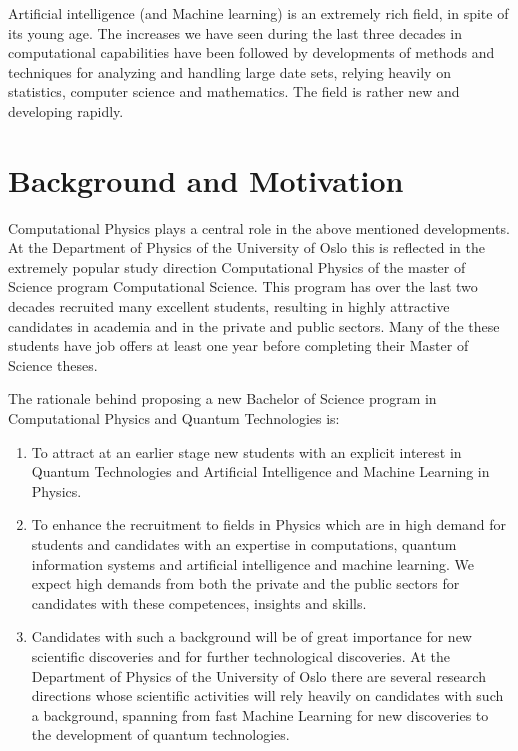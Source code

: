 \documentclass[aps,rmp,reprint,amsmath,amssymb,graphicx,longbibliography]{revtex4-1}
\begin{document}
Artificial intelligence (and Machine learning)  is an extremely rich field, in spite of its young age. The
increases we have seen during the last three decades in computational
capabilities have been followed by developments of methods and
techniques for analyzing and handling large date sets, relying heavily
on statistics, computer science and mathematics.  The field is rather
new and developing rapidly. \cite{deiana2021}

\section{Background and Motivation}

Computational Physics plays a central role in the above mentioned   developments. At the Department of Physics of the University of Oslo this is reflected in the extremely popular study direction Computational Physics of the master of Science program Computational Science. This program has over the last two decades recruited many excellent students, resulting in highly attractive candidates in academia and in  the private and public sectors. Many of the these students have job offers at least one year before completing their Master of Science theses.

The rationale behind proposing a new Bachelor of Science program in Computational Physics and Quantum Technologies is:
\begin{enumerate}
    \item To attract at an earlier stage new students with an explicit interest in Quantum Technologies and Artificial Intelligence and Machine Learning in Physics. 
    \item To enhance the recruitment to fields in Physics which are in high demand for students and candidates with an expertise in computations, quantum information systems and artificial intelligence and machine learning. We expect high demands from both the private and the public sectors for candidates with these competences, insights and skills.
    \item Candidates with such a background will be of great importance for new scientific discoveries and for further technological discoveries. At the Department of Physics of the University of Oslo there are several research directions whose scientific activities will rely heavily on candidates with such a background, spanning from fast Machine Learning for new discoveries to the development of quantum technologies.   
\end{enumerate}
\end{document}
